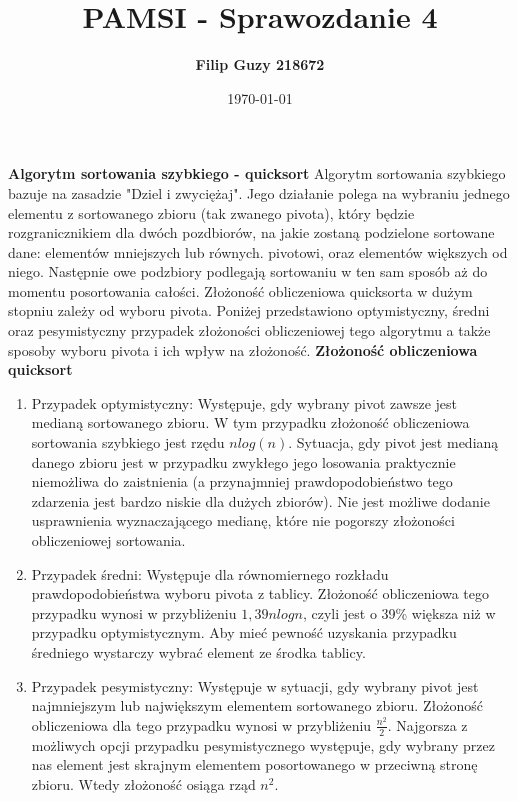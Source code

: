 \documentclass[10pt, a4paper]{article}
\date{\today}
\title{\textbf{PAMSI - Sprawozdanie 4}}
\author{\textbf{Filip Guzy 218672}}
\begin{document}
\maketitle

\begin{flushleft}
\textbf{Algorytm sortowania szybkiego - quicksort} \newline \newline
Algorytm sortowania szybkiego bazuje na zasadzie "Dziel i zwyciężaj". Jego działanie polega na wybraniu jednego elementu z sortowanego zbioru (tak zwanego pivota), który będzie rozgranicznikiem dla dwóch pozdbiorów, na jakie zostaną podzielone sortowane dane: elementów mniejszych lub równych. pivotowi, oraz elementów większych od niego. Następnie owe podzbiory podlegają sortowaniu w ten sam sposób aż do momentu posortowania całości. Złożoność obliczeniowa quicksorta w dużym stopniu zależy od wyboru pivota. Poniżej przedstawiono optymistyczny, średni oraz pesymistyczny przypadek złożoności obliczeniowej tego algorytmu a także sposoby wyboru pivota i ich wpływ na złożoność.\newline \newline
\textbf{Złożoność obliczeniowa quicksort}
\begin{enumerate}
\item Przypadek optymistyczny: \newline
Występuje, gdy wybrany pivot zawsze jest medianą sortowanego zbioru. W tym przypadku złożoność obliczeniowa sortowania szybkiego jest rzędu $nlog(n)$. Sytuacja, gdy pivot jest medianą danego zbioru jest w przypadku zwykłego jego losowania praktycznie niemożliwa do zaistnienia (a przynajmniej prawdopodobieństwo tego zdarzenia jest bardzo niskie dla dużych zbiorów). Nie jest możliwe dodanie usprawnienia wyznaczającego medianę, które nie pogorszy złożoności obliczeniowej sortowania.
\item Przypadek średni: \newline
Występuje dla równomiernego rozkładu prawdopodobieństwa wyboru pivota z tablicy. Złożoność obliczeniowa tego przypadku wynosi w przybliżeniu $1,39nlogn$, czyli jest o 39\% większa niż w przypadku optymistycznym. Aby mieć pewność uzyskania przypadku średniego wystarczy wybrać element ze środka tablicy.\newline
\item Przypadek pesymistyczny: \newline
Występuje w sytuacji, gdy wybrany pivot jest najmniejszym lub największym elementem sortowanego zbioru. Złożoność obliczeniowa dla tego przypadku wynosi w przybliżeniu $\frac{n^2}{2}$. Najgorsza z możliwych opcji przypadku pesymistycznego występuje, gdy wybrany przez nas element jest skrajnym elementem posortowanego w przeciwną stronę zbioru. Wtedy złożoność osiąga rząd $n^2$.
\end{enumerate}


\end{flushleft}
\end{document}
